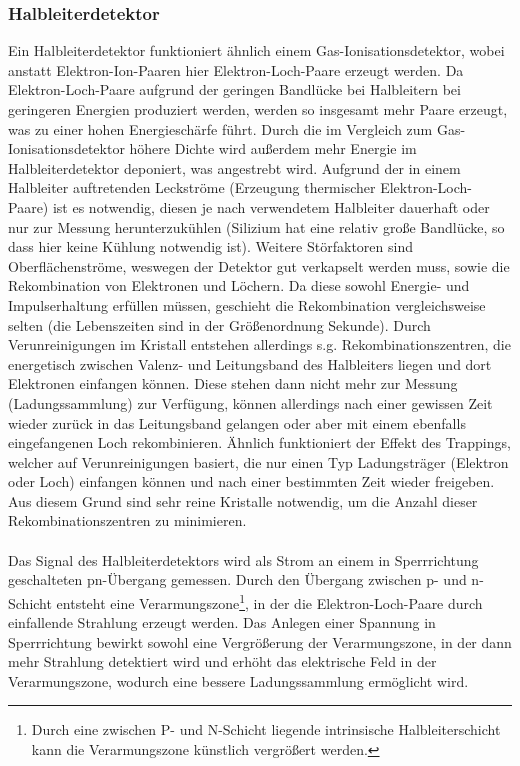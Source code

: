 \documentclass[11pt, a4paper]{article}
\numberwithin{equation}{section}
\begin{document}
\subsubsection{Halbleiterdetektor}
Ein Halbleiterdetektor funktioniert ähnlich einem Gas-Ionisationsdetektor, wobei anstatt Elektron-Ion-Paaren hier Elektron-Loch-Paare erzeugt werden.
Da Elektron-Loch-Paare aufgrund der geringen Bandlücke bei Halbleitern bei geringeren Energien produziert werden, werden so insgesamt mehr Paare erzeugt, was zu einer hohen Energieschärfe führt.
Durch die im Vergleich zum Gas-Ionisationsdetektor höhere Dichte wird außerdem mehr Energie im Halbleiterdetektor deponiert, was angestrebt wird.
Aufgrund der in einem Halbleiter auftretenden Leckströme (Erzeugung thermischer Elektron-Loch-Paare) ist es notwendig, diesen je nach verwendetem Halbleiter dauerhaft oder nur zur Messung herunterzukühlen (Silizium hat eine relativ große Bandlücke, so dass hier keine Kühlung notwendig ist).
Weitere Störfaktoren sind Oberflächenströme, weswegen der Detektor gut verkapselt werden muss, sowie die Rekombination von Elektronen und Löchern.
Da diese sowohl Energie- und Impulserhaltung erfüllen müssen, geschieht die Rekombination vergleichsweise selten (die Lebenszeiten sind in der Größenordnung Sekunde).
Durch Verunreinigungen im Kristall entstehen allerdings s.g. Rekombinationszentren, die energetisch zwischen Valenz- und Leitungsband des Halbleiters liegen und dort Elektronen einfangen können.
Diese stehen dann nicht mehr zur Messung (Ladungssammlung) zur Verfügung, können allerdings nach einer gewissen Zeit wieder zurück in das Leitungsband gelangen oder aber mit einem ebenfalls eingefangenen Loch rekombinieren.
Ähnlich funktioniert der Effekt des Trappings, welcher auf Verunreinigungen basiert, die nur einen Typ Ladungsträger (Elektron oder Loch) einfangen können und nach einer bestimmten Zeit wieder freigeben.
Aus diesem Grund sind sehr reine Kristalle notwendig, um die Anzahl dieser Rekombinationszentren zu minimieren.\\
\\
Das Signal des Halbleiterdetektors wird als Strom an einem in Sperrrichtung geschalteten pn-Übergang gemessen.
Durch den Übergang zwischen p- und n-Schicht entsteht eine Verarmungszone\footnote{Durch eine zwischen P- und N-Schicht liegende intrinsische Halbleiterschicht kann die Verarmungszone künstlich vergrößert werden.}, in der die Elektron-Loch-Paare durch einfallende Strahlung erzeugt werden.
Das Anlegen einer Spannung in Sperrrichtung bewirkt sowohl eine Vergrößerung der Verarmungszone, in der dann mehr Strahlung detektiert wird und erhöht das elektrische Feld in der Verarmungszone, wodurch eine bessere Ladungssammlung ermöglicht wird.
\end{document}
